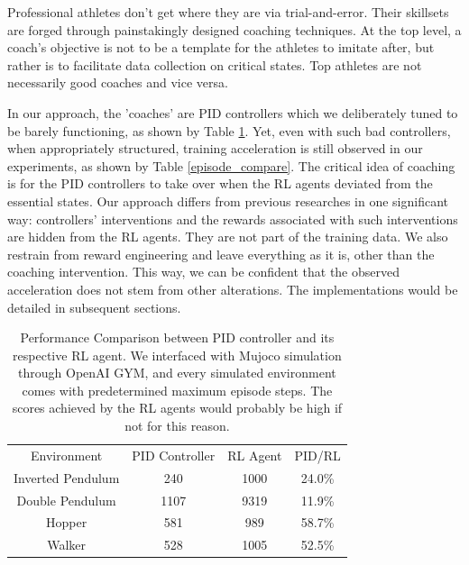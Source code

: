 \documentclass[journal]{IEEEtran}
\begin{document}
Professional athletes don't get where they are via trial-and-error. Their skillsets are forged through painstakingly designed coaching techniques. At the top level, a coach's objective is not to be a template for the athletes to imitate after, but rather is to facilitate data collection on critical states. Top athletes are not necessarily good coaches and vice versa. 

In our approach, the 'coaches' are PID controllers which we deliberately tuned to be barely functioning, as shown by Table \ref{score_compare}. Yet, even with such bad controllers, when appropriately structured, training acceleration is still observed in our experiments, as shown by Table \ref{episode_compare}. The critical idea of coaching is for the PID controllers to take over when the RL agents deviated from the essential states. Our approach differs from previous researches in one significant way: controllers' interventions and the rewards associated with such interventions are hidden from the RL agents. They are not part of the training data. We also restrain from reward engineering and leave everything as it is, other than the coaching intervention. This way, we can be confident that the observed acceleration does not stem from other alterations. The implementations would be detailed in subsequent sections.


\begin{table}[H]
\footnotesize
\caption{Performance Comparison between PID controller and its respective RL agent. We interfaced with Mujoco simulation through OpenAI GYM, and every simulated environment comes with predetermined maximum episode steps. The scores achieved by the RL agents would probably be high if not for this reason.}
\label{score_compare}
\centering
\begin{tabular}{ cccc }
\rowcolor{airforceblue}
Environment &   PID Controller &RL Agent &PID\slash RL \\
Inverted Pendulum &  240 & 1000&  24.0\%\\
\rowcolor{beaublue}

Double Pendulum &  1107 & 9319& 11.9\%\\

Hopper &  581 & 989& 58.7\%\\
\rowcolor{beaublue}
Walker &  528 & 1005& 52.5\%\\
\end{tabular}
\end{table}
\end{document}
